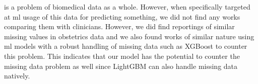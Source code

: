 is a problem of biomedical data as a whole. However, when specifically targeted at \ac{ml} usage of this data for predicting something, we did not find any works comparing them with clinicians. However, we did find reportings of similar missing values in obstetrics data \cite{venkateshMachineLearningStatistical2020} and we also found works of similar nature using \ac{ml} models with a robust handling of missing data such as XGBoost \cite{bitarMachineLearningAlgorithm2023} to counter this problem. This indicates that our model has the potential to counter the missing data problem as well since LightGBM can also handle missing data natively.

